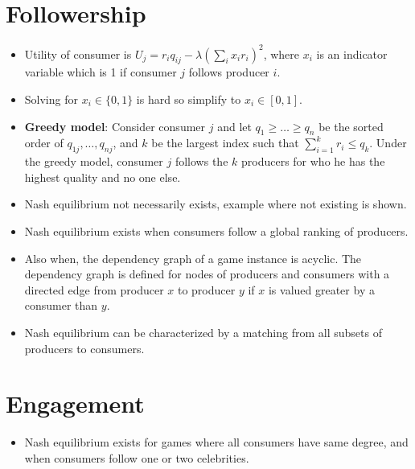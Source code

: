 \documentclass[8pt]{article}
\newcommand{\bi}{\begin{itemize}}
\newcommand{\ei}{\end{itemize}}
\begin{document}
\section{Followership}
\bi
\item Utility of consumer is $U_{j} = r_{i}q_{ij} - \lambda (\sum_{i}x_i
    r_{i})^2$, where $x_i$ is an indicator variable which is 1 if consumer $j$
    follows producer $i$.
\item Solving for $x_i \in \{0, 1\}$ is hard so simplify to $x_i \in [0,1]$.
\item \textbf{Greedy model}: Consider consumer $j$ and let $q_1 \geq \ldots \geq q_n$ be the sorted
    order of $q_{1j},\ldots,q_{nj}$, and $k$ be the largest index such that
    $\sum_{i=1}^{k}r_i \leq q_k$. Under the greedy model, consumer $j$
    follows the $k$ producers for who he has the highest quality and no one
    else.
\item Nash equilibrium not necessarily exists, example where not existing is
    shown.
\item Nash equilibrium exists when consumers follow a global ranking of
    producers.
\item Also when, the dependency graph of a game instance is acyclic. The
    dependency graph is defined for nodes of producers and consumers with a
    directed edge from producer $x$ to producer $y$ if $x$ is valued greater by
    a consumer than $y$.
\item Nash equilibrium can be characterized by a matching from all subsets of
    producers to consumers.
\ei

\section{Engagement}
\bi
\item Nash equilibrium exists for games where all consumers have same degree,
    and when consumers follow one or two celebrities.
\ei
 
\end{document}
